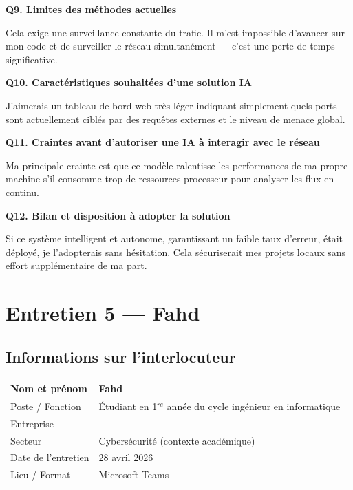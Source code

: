 \documentclass[12pt,a4paper]{article}
\begin{document}
\bigskip
\textbf{Q9. Limites des m\'{e}thodes actuelles}

Cela exige une surveillance constante du trafic. Il m'est impossible d'avancer sur mon code et
de surveiller le r\'{e}seau simultan\'{e}ment --- c'est une perte de temps significative.

\bigskip
\textbf{Q10. Caract\'{e}ristiques souhait\'{e}es d'une solution IA}

J'aimerais un tableau de bord web tr\`{e}s l\'{e}ger indiquant simplement quels ports sont
actuellement cibl\'{e}s par des requ\^{e}tes externes et le niveau de menace global.

\bigskip
\textbf{Q11. Craintes avant d'autoriser une IA \`{a} interagir avec le r\'{e}seau}

Ma principale crainte est que ce mod\`{e}le ralentisse les performances de ma propre machine
s'il consomme trop de ressources processeur pour analyser les flux en continu.

\bigskip
\textbf{Q12. Bilan et disposition \`{a} adopter la solution}

Si ce syst\`{e}me intelligent et autonome, garantissant un faible taux d'erreur, \'{e}tait d\'{e}ploy\'{e}, je
l'adopterais sans h\'{e}sitation. Cela s\'{e}curiserait mes projets locaux sans effort suppl\'{e}mentaire
de ma part.

\clearpage

\section{Entretien 5 --- Fahd}

\subsection*{Informations sur l'interlocuteur}

\begin{tabular}{@{}B{4cm} L{10.5cm}@{}}
  \hline
  Nom et pr\'{e}nom      & Fahd \\
  \hline
  Poste / Fonction   & \'{E}tudiant en 1$^{re}$ ann\'{e}e du cycle ing\'{e}nieur en informatique \\
  \hline
  Entreprise         & --- \\
  \hline
  Secteur            & Cybers\'{e}curit\'{e} (contexte acad\'{e}mique) \\
  \hline
  Date de l'entretien & 28 avril 2026 \\
  \hline
  Lieu / Format      & Microsoft Teams \\
  \hline
\end{tabular}
\end{document}

